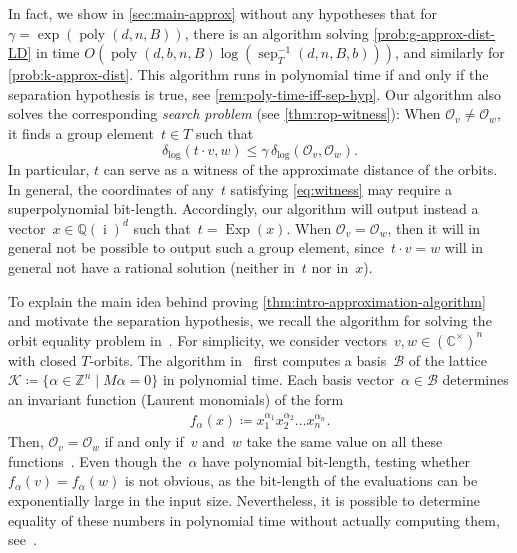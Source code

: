 \documentclass[a4paper,USenglish,cleveref,numberwithinsect]{lipics-v2021}
\DeclareMathOperator{\poly}{poly}
\DeclareMathOperator{\sep}{sep}
\DeclareMathOperator{\ii}{i}
\DeclareMathOperator{\Exp}{Exp}
\newcommand{\distLD}{\delta_{\log}}
\newcommand{\QQ}{\mathbb{Q}}
\newcommand{\CC}{\mathbb{C}}
\newcommand{\ZZ}{\mathbb{Z}}
\newcommand{\OO}{\ensuremath{\mathcal{O}}}
\numberwithin{equation}{section}
\begin{document}
In fact, we show in \cref{sec:main-approx} without any hypotheses that for~$\gamma = \exp(\poly(d,n,B))$,
there is an algorithm solving \cref{prob:g-approx-dist-LD} in time $O(\poly(d,b,n,B) \log(\sep^{-1}_T(d,n,B,b)))$,
and similarly for \cref{prob:k-approx-dist}.
This algorithm runs in polynomial time if and only if the separation hypothesis is true, see \cref{rem:poly-time-iff-sep-hyp}.
Our algorithm also solves the corresponding \emph{search problem} (see \cref{thm:rop-witness}):
When $\OO_v\ne\OO_w$, it finds a group element~$t \in T$ such that%
\begin{equation}\label{eq:witness}
  \distLD( t \cdot v, w ) \leq \gamma \, \distLD(\OO_v,\OO_w).
\end{equation}
In particular, $t$ can serve as a witness of the approximate distance of the orbits.
In general, the coordinates of any~$t$ satisfying \cref{eq:witness} may require a superpolynomial bit-length.
Accordingly, our algorithm will output instead a vector~$x\in \QQ(\ii)^d$ such that~$t = \Exp(x)$.
When $\OO_v = \OO_w$, then it will in general not be possible to output such a group element,
since~$t \cdot v = w$
will in general not have a rational solution (neither in~$t$ nor in~$x$).

To explain the main idea behind proving \cref{thm:intro-approximation-algorithm}
and motivate the separation hypothesis,
we recall the algorithm for solving the orbit equality problem in~\cite{torus}.
For simplicity, we consider vectors~$v,w\in(\CC^\times)^n$ with closed $T$-orbits.
The algorithm in~\cite{torus} first computes a basis~$\mathcal B$ of the lattice
$\mathcal{K} \coloneqq \{ \alpha\in\ZZ^n \mid M\alpha=0 \}$ in polynomial time.
Each basis vector~$\alpha \in \mathcal B$ determines an invariant function (Laurent monomials)
of the form
\begin{align*}
  f_\alpha(x) %
\coloneqq x_1^{\alpha_1} x_2^{\alpha_2}\dots x_n^{\alpha_n}.
\end{align*}
Then, $\OO_v=\OO_w$ if and only if~$v$ and~$w$ take the same value
on all these functions~\cite[Corollary~5.2]{torus}.
Even though the~$\alpha$ have polynomial bit-length,
testing whether~$f_\alpha(v) = f_\alpha(w)$ is not obvious,
as the bit-length of the evaluations can be exponentially large in the input size.
Nevertheless, it is possible to determine equality of these numbers in polynomial time
without actually computing them, see~\cite[Proposition~5.5]{torus}.
\end{document}
